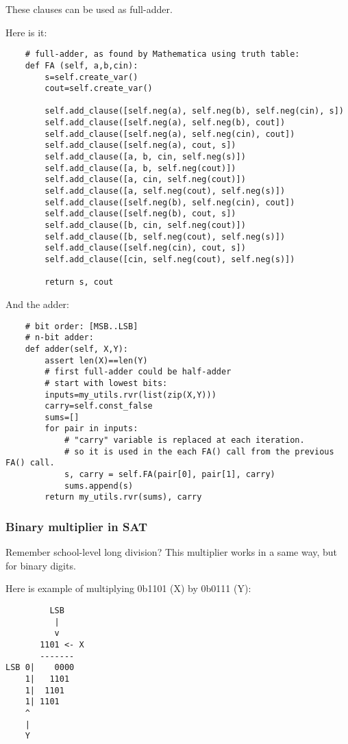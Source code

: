 These clauses can be used as full-adder.

Here is it:

\begin{lstlisting}
    # full-adder, as found by Mathematica using truth table:
    def FA (self, a,b,cin):
        s=self.create_var()
        cout=self.create_var()

        self.add_clause([self.neg(a), self.neg(b), self.neg(cin), s])
        self.add_clause([self.neg(a), self.neg(b), cout])
        self.add_clause([self.neg(a), self.neg(cin), cout])
        self.add_clause([self.neg(a), cout, s])
        self.add_clause([a, b, cin, self.neg(s)])
        self.add_clause([a, b, self.neg(cout)])
        self.add_clause([a, cin, self.neg(cout)])
        self.add_clause([a, self.neg(cout), self.neg(s)])
        self.add_clause([self.neg(b), self.neg(cin), cout])
        self.add_clause([self.neg(b), cout, s])
        self.add_clause([b, cin, self.neg(cout)])
        self.add_clause([b, self.neg(cout), self.neg(s)])
        self.add_clause([self.neg(cin), cout, s])
        self.add_clause([cin, self.neg(cout), self.neg(s)])

        return s, cout
\end{lstlisting}

And the adder:

\begin{lstlisting}
    # bit order: [MSB..LSB]
    # n-bit adder:
    def adder(self, X,Y):
        assert len(X)==len(Y)
        # first full-adder could be half-adder
        # start with lowest bits:
        inputs=my_utils.rvr(list(zip(X,Y)))
        carry=self.const_false
        sums=[]
        for pair in inputs:
            # "carry" variable is replaced at each iteration.
            # so it is used in the each FA() call from the previous FA() call.
            s, carry = self.FA(pair[0], pair[1], carry)
            sums.append(s)
        return my_utils.rvr(sums), carry
\end{lstlisting}

\subsubsection{Binary multiplier in SAT}

Remember school-level long division?
This multiplier works in a same way, but for binary digits.

Here is example of multiplying 0b1101 (X) by 0b0111 (Y):

\begin{lstlisting}
         LSB
          |
          v
       1101 <- X
       -------
LSB 0|    0000
    1|   1101
    1|  1101
    1| 1101
    ^
    |
    Y
\end{lstlisting}

